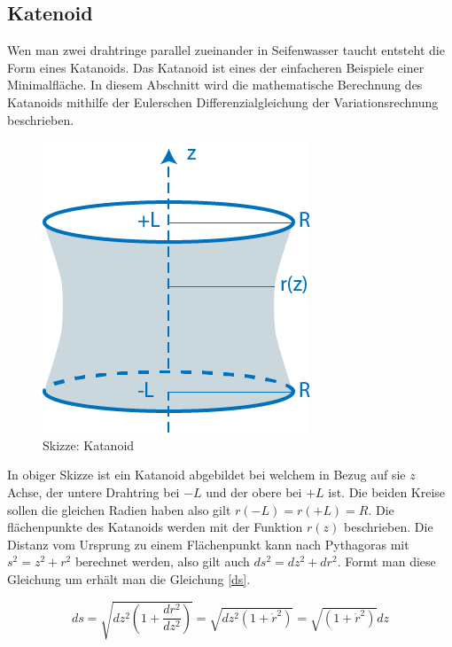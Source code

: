 \subsection{Katenoid}
Wen man zwei drahtringe parallel zueinander in Seifenwasser taucht entsteht die Form eines Katanoids. 
Das Katanoid ist eines der einfacheren Beispiele einer Minimalfläche. 
In diesem Abschnitt wird die mathematische Berechnung des Katanoids mithilfe der Eulerschen Differenzialgleichung der Variationsrechnung beschrieben.
\begin{figure}[H]
  \centering
  \includegraphics[scale=1]{minimal/soap_film_catanoid.PNG}
  \caption{Skizze: Katanoid} 
\end{figure}
In obiger Skizze ist ein Katanoid abgebildet bei welchem in Bezug auf sie $z$ Achse, der untere Drahtring bei $-L$ und der obere bei $+L$ ist. 
Die beiden Kreise sollen die gleichen Radien haben also gilt $r(-L)=r(+L)=R$. Die flächenpunkte des Katanoids werden mit der Funktion $r(z)$ beschrieben. 
Die Distanz vom Ursprung zu einem Flächenpunkt kann nach Pythagoras mit $s^2=z^2+r^2$ berechnet werden, also gilt auch $ds^2=dz^2+dr^2$.
Formt man diese Gleichung um erhält man die Gleichung \eqref{ds}.

\begin{equation} \label{ds}
  ds=\sqrt{dz^2(1+\frac{dr^2}{dz^2})}= \sqrt{dz^2(1+\dot r^2)}=\sqrt{(1+\dot r^2)}dz
 
\end{equation}
